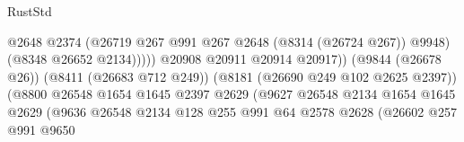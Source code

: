 \begin{lexlean}{RustStd}
\begin{coremodule}
                                                            @2648
                                                            @2374
                                                            (@26719
                                                              @267
                                                              @991
                                                              @267
                                                              @2648
                                                              (@8314 (@26724 @267))
                                                              @9948)
                                                            (@8348 @26652 @2134)))))
                                                    @20908
                                                    @20911
                                                    @20914
                                                    @20917))
                                                (@9844 (@26678 @26))
                                                (@8411 (@26683 @712 @249))
                                                (@8181 (@26690 @249 @102 @2625 @2397))
                                                (@8800
                                                  @26548
                                                  @1654
                                                  @1645
                                                  @2397
                                                  @2629
                                                  (@9627
                                                    @26548
                                                    @2134
                                                    @1654
                                                    @1645
                                                    @2629
                                                    (@9636
                                                      @26548
                                                      @2134
                                                      @128
                                                      @255
                                                      @991
                                                      @64
                                                      @2578
                                                      @2628
                                                      (@26602
                                                        @257
                                                        @991
                                                        @9650

\end{coremodule}
\end{lexlean}
